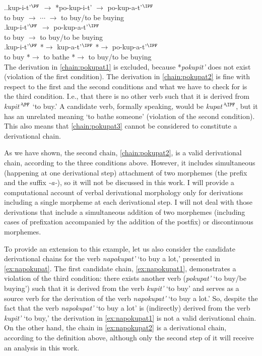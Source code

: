 \ex.\label{chain:pokupat}\ag.\label{chain:pokupat1}kup-i-t'$^\PF$ $\rightarrow$ *po-kup-i-t' $\rightarrow$ po-kup-a-t'$^\IPF$\\	
{to buy} $\rightarrow$ $\cdots$ $\rightarrow$ {to buy/to be buying}\\
\bg.\label{chain:pokupat2}kup-i-t'$^\PF$ $\rightarrow$ po-kup-a-t'$^\IPF$\\
{to buy} $\rightarrow$ {to buy/to be buying}\\
\bg.\label{chain:pokupat3}kup-i-t'$^\PF$ *$\rightarrow$ kup-a-t'$^\IPF$ *$\rightarrow$ po-kup-a-t'$^\IPF$\\
{to buy} *$\rightarrow$ {to bathe} *$\rightarrow$ {to buy/to be buying}\\

The derivation in \ref{chain:pokupat1} is excluded, because *\textit{pokupit'} does not exist (violation of the first condition). The derivation in \ref{chain:pokupat2} is fine with respect to the first and the second conditions and what we have to check for is the third condition. I.e., that there is no other verb such that it is derived from \textit{kupit'}$^\PF$ `to buy.'  A candidate verb, formally speaking, would be \textit{kupat'$^\IPF$}, but it has an unrelated meaning `to bathe someone' (violation of the second condition). This also means that \ref{chain:pokupat3} cannot be considered to constitute a derivational chain.  

As we have shown, the second chain, \ref{chain:pokupat2}, is a valid derivational chain, according to the three conditions above. However, it includes simultaneous (happening at one derivational step) attachment of two morphemes (the prefix  and the suffix \textit{-a-}), so it will not be discussed in this work. I will provide a computational account of verbal derivational morphology only for derivations including a single morpheme at each derivational step. I will not deal with those derivations that include a simultaneous addition of two morphemes (including cases of prefixation accompanied by the addition of the postfix) or discontinuous morphemes.

To provide an extension to this example, let us also consider the candidate derivational chains for the verb \textit{napokupat'} `to buy a lot,' presented in \ref{ex:napokupat}. The first candidate chain, \ref{ex:napokupat1}, demonstrates a violation of the third condition: there exists another verb (\textit{pokupat'} `to buy/be buying') such that it is derived from the verb \textit{kupit'} `to buy' and serves as a source verb for the derivation of the verb \textit{napokupat'} `to buy a lot.' So, despite the fact that the verb \textit{napokupat'} `to buy a lot' is (indirectly) derived from the verb \textit{kupit'} `to buy,' the derivation in \ref{ex:napokupat1} is not a valid derivational chain. On the other hand, the chain in \ref{ex:napokupat2} is a derivational chain, according to the definition above, although only the second step of it will receive an analysis in this work. 

